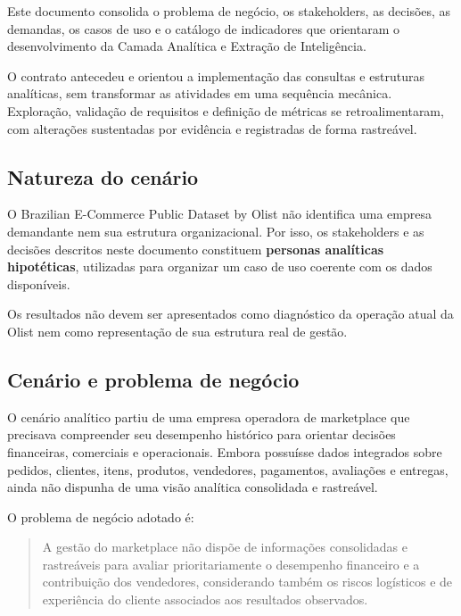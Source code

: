 \documentclass[12pt,a4paper]{article}
\begin{document}
Este documento consolida o problema de negócio, os stakeholders, as
decisões, as demandas, os casos de uso e o catálogo de indicadores que
orientaram o desenvolvimento da Camada Analítica e Extração de Inteligência.

O contrato antecedeu e orientou a implementação das consultas e
estruturas analíticas, sem transformar as atividades em uma sequência
mecânica. Exploração, validação de requisitos e definição de métricas se
retroalimentaram, com alterações sustentadas por evidência e registradas
de forma rastreável.

\subsection{Natureza do
cenário}\label{docs__analytics__contrato_analitico.md__natureza-do-cenuxe1rio}

O Brazilian E-Commerce Public Dataset by Olist não identifica uma
empresa demandante nem sua estrutura organizacional. Por isso, os
stakeholders e as decisões descritos neste documento constituem
\textbf{personas analíticas hipotéticas}, utilizadas para organizar um
caso de uso coerente com os dados disponíveis.

Os resultados não devem ser apresentados como diagnóstico da operação
atual da Olist nem como representação de sua estrutura real de gestão.

\subsection{Cenário e problema de
negócio}\label{docs__analytics__contrato_analitico.md__cenuxe1rio-e-problema-de-neguxf3cio}

O cenário analítico partiu de uma empresa operadora de marketplace que
precisava compreender seu desempenho histórico para orientar decisões
financeiras, comerciais e operacionais. Embora possuísse dados integrados
sobre pedidos, clientes, itens, produtos, vendedores, pagamentos,
avaliações e entregas, ainda não dispunha de uma visão analítica
consolidada e rastreável.

O problema de negócio adotado é:

\begin{quote}
A gestão do marketplace não dispõe de informações consolidadas e
rastreáveis para avaliar prioritariamente o desempenho financeiro e a
contribuição dos vendedores, considerando também os riscos logísticos e
de experiência do cliente associados aos resultados observados.
\end{quote}
\end{document}
